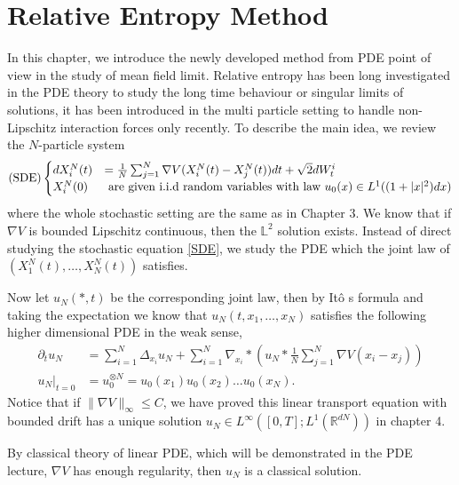 \chapter{Relative Entropy Method}
In this chapter, we introduce the newly developed method from PDE point of view in the study of mean field limit. Relative  entropy has been long investigated in the PDE theory to study the long time behaviour or singular limits of solutions, it has been introduced in the multi particle setting to handle non-Lipschitz interaction forces only recently. To describe the main idea, we review the $N$-particle system
\begin{align}\label{SDE}
  (\text{SDE})\begin{cases}
   dX_i^N(t) &= \frac{1}{N}\sum_{j=1}^{N} \nabla V (X_i^{N}(t)-X_j^{N}(t)  )  dt + \sqrt{2}dW_t^i\\
    X_i^N(0) & \text{ are given i.i.d random variables with law } u_{0}(x) \in L^{1} ((1 + \lvert x\rvert^2) dx) 
  \end{cases}
\end{align} 
where the whole stochastic setting are the same as in Chapter 3. We know that if $\nabla V$ is bounded Lipschitz continuous, then the $\mathbb{L}^2$ solution exists. Instead of direct studying the stochastic equation \autoref{SDE}, we study the PDE which the joint law of $(X_1^N(t),\ldots ,X_N^{N}(t))$ satisfies. 

Now let $u_N(*,t)$ be the corresponding joint law, then by It\^o s formula and taking the expectation we know that $u_N(t,x_1,\ldots,x_N)$ satisfies the following higher dimensional PDE in the weak sense,
\begin{align}\label{PDEuN}
  \partial_t u_{N} &= \sum_{i=1}^{N} \Delta_{x_i} u_N + \sum_{i=1}^{N} \nabla_{x_i} * (u_N * \frac{1}{N} \sum_{j=1}^{N} \nabla V (x_i-x_j ))\\
  \label{IDHD}
  u_{N}\rvert_{t=0} &= u_0^{\otimes N}  = u_{0}(x_{1})u_{0}(x_{2})\ldots u_0(x_N)
.\end{align}
Notice that if $\|\nabla V\|_{\infty} \le C$, we have proved this linear transport equation with bounded drift has a unique solution $u_N \in  L^{\infty}([0,T] ; L^{1}(\mathbb{R}^{dN} ) ) $ in chapter 4. 
\begin{remark}
	By classical theory of linear PDE, which will be demonstrated in the PDE lecture, $\nabla V$ has enough regularity, then $u_N$ is a classical solution.
\end{remark}

